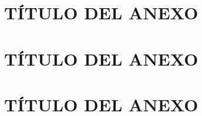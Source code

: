 \documentclass[letterpaper,titlepage,12pt,oneside,spanish,final]{report_eie}
\begin{document}
\appendix

\renewcommand \thechapter{\Roman{chapter}}
\chapter{TÍTULO DEL ANEXO}\label{CAP:anexo0}

\chapter{TÍTULO DEL ANEXO}\label{CAP:anexo1}

\chapter{TÍTULO DEL ANEXO}\label{CAP:anexo2}




\newpage

%
\renewcommand{\bibname}{REFERENCIAS}
\let\oldbibsection\bibsection




\printindex%
\end{document}
